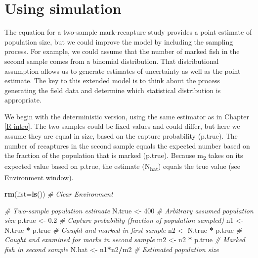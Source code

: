 \documentclass[
]{krantz}
\makeatletter
\newenvironment{Shaded}{\begin{snugshade}}{\end{snugshade}}
\newcommand{\AttributeTok}[1]{\textcolor[rgb]{0.27,0.27,0.27}{#1}}
\newcommand{\CommentTok}[1]{\textcolor[rgb]{0.37,0.37,0.37}{\textit{#1}}}
\newcommand{\DecValTok}[1]{\textcolor[rgb]{0.06,0.06,0.06}{#1}}
\newcommand{\FloatTok}[1]{\textcolor[rgb]{0.06,0.06,0.06}{#1}}
\newcommand{\FunctionTok}[1]{\textcolor[rgb]{0.27,0.27,0.27}{\textbf{#1}}}
\newcommand{\NormalTok}[1]{#1}
\newcommand{\OtherTok}[1]{\textcolor[rgb]{0.37,0.37,0.37}{#1}}
\newcommand{\SpecialCharTok}[1]{\textcolor[rgb]{0.43,0.43,0.43}{\textbf{#1}}}
\newenvironment{kframe}{%
\medskip{}
\setlength{\fboxsep}{.8em}
 \def\at@end@of@kframe{}%
 \ifinner\ifhmode%
  \def\at@end@of@kframe{\end{minipage}}%
  \begin{minipage}{\columnwidth}%
 \fi\fi%
 \def\FrameCommand##1{\hskip\@totalleftmargin \hskip-\fboxsep
 \colorbox{shadecolor}{##1}\hskip-\fboxsep
     \hskip-\linewidth \hskip-\@totalleftmargin \hskip\columnwidth}%
 \MakeFramed {\advance\hsize-\width
   \@totalleftmargin\z@ \linewidth\hsize
   \@setminipage}}%
 {\par\unskip\endMakeFramed%
 \at@end@of@kframe}
\renewenvironment{Shaded}{\begin{kframe}}{\end{kframe}}
\makeatother
\begin{document}
\hypertarget{Model-fit-sim}{%
\section{Using simulation}\label{Model-fit-sim}}

The equation for a two-sample mark-recapture study provides a point estimate of population size, but we could improve the model by including the sampling process. For example, we could assume that the number of marked fish in the second sample comes from a binomial distribution. That distributional assumption allows us to generate estimates of uncertainty as well as the point estimate. The key to this extended model is to think about the process generating the field data and determine which statistical distribution is appropriate.

We begin with the deterministic version, using the same estimator as in Chapter \ref{R-intro}. The two samples could be fixed values and could differ, but here we assume they are equal in size, based on the capture probability (p.true). The number of recaptures in the second sample equals the expected number based on the fraction of the population that is marked (p.true). Because m\textsubscript{2} takes on its expected value based on p.true, the estimate (N\textsubscript{hat}) equals the true value (see Environment window).

\begin{Shaded}
\begin{Highlighting}[]
\FunctionTok{rm}\NormalTok{(}\AttributeTok{list=}\FunctionTok{ls}\NormalTok{()) }\CommentTok{\# Clear Environment}

\CommentTok{\# Two{-}sample population estimate}
\NormalTok{N.true }\OtherTok{\textless{}{-}} \DecValTok{400}  \CommentTok{\# Arbitrary assumed population size}
\NormalTok{p.true }\OtherTok{\textless{}{-}} \FloatTok{0.2} \CommentTok{\# Capture probability (fraction of population sampled)}
\NormalTok{n1 }\OtherTok{\textless{}{-}}\NormalTok{ N.true }\SpecialCharTok{*}\NormalTok{ p.true }\CommentTok{\# Caught and marked in first sample}
\NormalTok{n2 }\OtherTok{\textless{}{-}}\NormalTok{ N.true }\SpecialCharTok{*}\NormalTok{ p.true }\CommentTok{\# Caught and examined for marks in second sample}
\NormalTok{m2 }\OtherTok{\textless{}{-}}\NormalTok{ n2 }\SpecialCharTok{*}\NormalTok{ p.true }\CommentTok{\# Marked fish in second sample}
\NormalTok{N.hat }\OtherTok{\textless{}{-}}\NormalTok{ n1}\SpecialCharTok{*}\NormalTok{n2}\SpecialCharTok{/}\NormalTok{m2 }\CommentTok{\# Estimated population size}
\end{Highlighting}
\end{Shaded}
\end{document}
